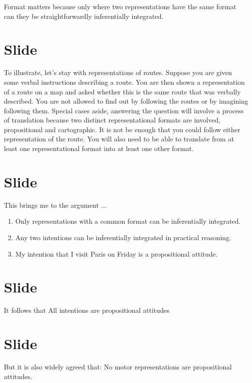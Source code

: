 \documentclass[12pt,\papersize]{extarticle}
\begin{document}
Format matters because only where two representations have the same format can they be straightforwardly inferentially integrated.



\section{Slide}
To illustrate, let’s stay with representations of routes.  
Suppose you are given some verbal instructions describing a route. You are then shown a representation of a route on a map and asked whether this is the same route that was verbally described. You are not allowed to find out by following the routes or by imagining following them. 
Special cases aside, answering the question will involve a process of translation because two distinct representational formats are involved, propositional and cartographic. It is not be enough that you could follow either representation of the route. You will also need to be able to translate from at least one representational format into at least one other format. 



\section{Slide}
This brings me to the argument ...

\begin{enumerate}
\item Only representations with a common format can be inferentially integrated.

\item Any two intentions can be inferentially integrated in practical reasoning.

\item My intention that I visit Paris on Friday is a propositional attitude.
\end{enumerate}


\section{Slide}
It follows that 
All intentions are propositional attitudes



\section{Slide}
But it is also widely agreed that:
No motor representations are propositional attitudes.
\end{document}
